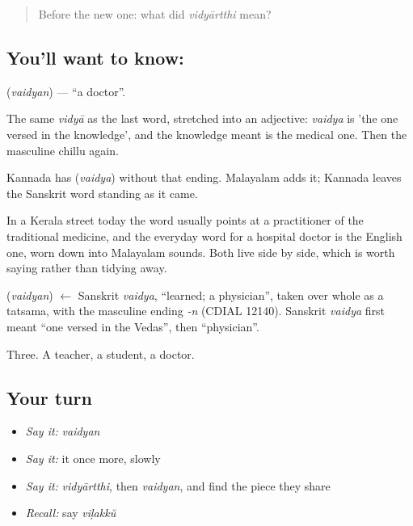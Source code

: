 \label{lesson:ML-C48-doctor}



\begin{quote}
Before the new one: what did \emph{vidyārtthi} mean?
\end{quote}

\subsection*{You'll want to know: }
\textbf{} (\emph{vaidyan}) — \textquotedblleft{}a doctor\textquotedblright{}.

The same \emph{vidyā} as the last word, stretched into an adjective: \emph{vaidya} is 'the one versed in the knowledge', and the knowledge meant is the medical one. Then the masculine chillu  again.

Kannada has  (\emph{vaidya}) without that ending. Malayalam adds it; Kannada leaves the Sanskrit word standing as it came.

In a Kerala street today the word usually points at a practitioner of the traditional medicine, and the everyday word for a hospital doctor is the English one, worn down into Malayalam sounds. Both live side by side, which is worth saying rather than tidying away.

\begin{cousinweb}
\textbf{} (\emph{vaidyan}) $\leftarrow$ Sanskrit \emph{vaidya}, \textquotedblleft{}learned; a physician\textquotedblright{}, taken over whole as a tatsama, with the masculine ending \emph{-n} (CDIAL 12140). Sanskrit \emph{vaidya} first meant \textquotedblleft{}one versed in the Vedas\textquotedblright{}, then \textquotedblleft{}physician\textquotedblright{}.
\end{cousinweb}

\begin{grammarlens}[title={What you've built}]
Three. A teacher, a student, a doctor.
\end{grammarlens}

\subsection*{Your turn}
\begin{itemize}
\raggedright
  \item \emph{Say it:} \emph{vaidyan}
  \item \emph{Say it:} it once more, slowly
  \item \emph{Say it:} \emph{vidyārtthi}, then \emph{vaidyan}, and find the piece they share
  \item \emph{Recall:} say \emph{viḷakkŭ}
\end{itemize}

